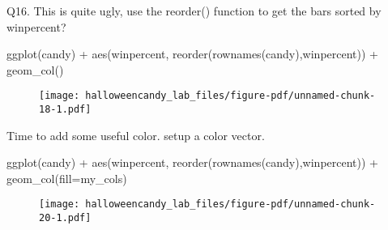 \documentclass[
  letterpaper,
  DIV=11,
  numbers=noendperiod]{scrartcl}
\newenvironment{Shaded}{\begin{snugshade}}{\end{snugshade}}
\newcommand{\AttributeTok}[1]{\textcolor[rgb]{0.40,0.45,0.13}{#1}}
\newcommand{\FunctionTok}[1]{\textcolor[rgb]{0.28,0.35,0.67}{#1}}
\newcommand{\NormalTok}[1]{\textcolor[rgb]{0.00,0.23,0.31}{#1}}
\newcommand{\OtherTok}[1]{\textcolor[rgb]{0.00,0.23,0.31}{#1}}
\newcommand{\SpecialCharTok}[1]{\textcolor[rgb]{0.37,0.37,0.37}{#1}}
\newcommand{\StringTok}[1]{\textcolor[rgb]{0.13,0.47,0.30}{#1}}
\begin{document}
Q16. This is quite ugly, use the reorder() function to get the bars
sorted by winpercent?

\begin{Shaded}
\begin{Highlighting}[]
\FunctionTok{ggplot}\NormalTok{(candy) }\SpecialCharTok{+} 
 \FunctionTok{aes}\NormalTok{(winpercent, }\FunctionTok{reorder}\NormalTok{(}\FunctionTok{rownames}\NormalTok{(candy),winpercent)) }\SpecialCharTok{+} \FunctionTok{geom\_col}\NormalTok{()}
\end{Highlighting}
\end{Shaded}

\begin{figure}[H]

{\centering \texttt{[image: halloweencandy\_lab\_files/figure-pdf/unnamed-chunk-18-1.pdf]}

}

\end{figure}

Time to add some useful color. setup a color vector.

\begin{Shaded}
\end{Shaded}

\begin{Shaded}
\begin{Highlighting}[]
\FunctionTok{ggplot}\NormalTok{(candy) }\SpecialCharTok{+} 
  \FunctionTok{aes}\NormalTok{(winpercent, }\FunctionTok{reorder}\NormalTok{(}\FunctionTok{rownames}\NormalTok{(candy),winpercent)) }\SpecialCharTok{+}
  \FunctionTok{geom\_col}\NormalTok{(}\AttributeTok{fill=}\NormalTok{my\_cols) }
\end{Highlighting}
\end{Shaded}

\begin{figure}[H]

{\centering \texttt{[image: halloweencandy\_lab\_files/figure-pdf/unnamed-chunk-20-1.pdf]}

}

\end{figure}
\end{document}
